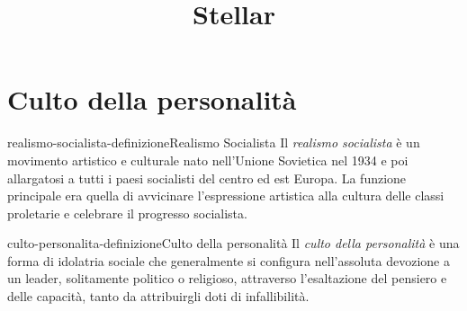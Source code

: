 \documentclass[preview]{standalone}
\begin{document}
\title{Stellar}
\genpage

\section{Culto della personalità}

\begin{snippetdefinition}{realismo-socialista-definizione}{Realismo Socialista}
    Il \textit{realismo socialista} è un movimento artistico e culturale nato nell'Unione Sovietica nel 1934 e poi allargatosi a tutti i paesi socialisti del centro ed est Europa. La funzione principale era quella di avvicinare l'espressione artistica alla cultura delle classi proletarie e celebrare il progresso socialista.
\end{snippetdefinition}

\begin{snippetdefinition}{culto-personalita-definizione}{Culto della personalità}
    Il \textit{culto della personalità} è una forma di idolatria sociale che
    generalmente si configura nell'assoluta devozione a un leader,
    solitamente politico o religioso, attraverso l'esaltazione del pensiero e 
    delle capacità, tanto da attribuirgli doti di infallibilità.
\end{snippetdefinition}
\end{document}
